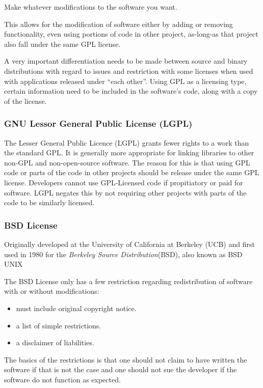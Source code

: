 \documentclass[12pt, onecolumn]{witseiepaper}
\begin{document}
\textbullet \space Make whatever modifications to the software you want.

This allows for the modification of software either by adding or removing functionality, even using portions of code in other project, as-long-as that project also fall under the same GPL license.

A very important differentiation needs to be made between source and binary distributions with regard to issues and restriction with some licenses when used with applications released under “each other”.  Using GPL as a licensing type, certain information need to be included in the software’s code, along with a copy of the license.

\subsubsection{GNU Lessor General Public License (LGPL)}


The Lesser General Public Licence (LGPL) grants fewer rights to a work than the standard GPL. \cite{LGPL}  It is generally more appropriate for linking libraries to other non-GPL and non-open-source software.  The reason for this is that using GPL code or parts of the code in other projects should be release under the same GPL license.  Developers cannot use GPL-Licensed code if propitiatory or paid for software.  LGPL negates this by not requiring other projects with parts of the code to be similarly licensed.

\subsubsection{BSD License}


Originally developed at the University of California at Berkeley (UCB) \cite{BSD} and first used in 1980 for the \textit{Berkeley Source Distribution}(BSD), also known as BSD UNIX

The BSD License only has a few restriction regarding redistribution of software with or without modifications:

\begin{itemize}
	\item must include original copyright notice.
	\item a list of simple restrictions.
	\item a disclaimer of liabilities.
\end{itemize}

The basics of the restrictions is that one should not claim to have written the software if that is not the case and one should not sue the developer if the software do not function as expected.  
\end{document}
